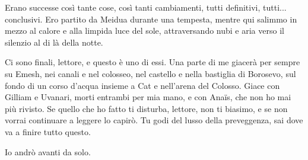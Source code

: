 Erano successe così tante cose, così tanti cambiamenti, tutti
definitivi, tutti... conclusivi. Ero partito da Meidua durante una
tempesta, mentre qui salimmo in mezzo al calore e alla limpida luce del
sole, attraversando nubi e aria verso il silenzio al di là della notte.

\begin{figure}
	\centering
	\def\svgwidth{\columnwidth}
	\scalebox{0.2}{}
\end{figure}

Ci sono finali, lettore, e questo è uno di essi. Una parte di me giacerà
per sempre su Emesh, nei canali e nel colosseo, nel castello e nella
bastiglia di Borosevo, sul fondo di un corso d'acqua insieme a Cat e
nell'arena del Colosso. Giace con Gilliam e Uvanari, morti entrambi per
mia mano, e con Anaïs, che non ho mai più rivisto. Se quello che ho
fatto ti disturba, lettore, non ti biasimo, e se non vorrai continuare a
leggere lo capirò. Tu godi del lusso della preveggenza, sai dove va a
finire tutto questo.

Io andrò avanti da solo.
